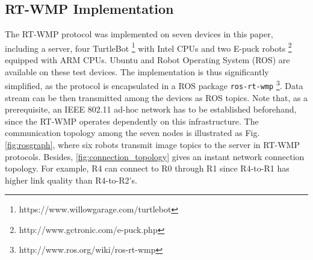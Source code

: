 \documentclass[journal]{IEEEtran}  %
\begin{document}
\subsection{RT-WMP Implementation}
\label{sec:rtwmp}
%
%
%

The RT-WMP protocol was implemented on seven devices in this paper, including a
server, four TurtleBot \footnote{https://www.willowgarage.com/turtlebot} with
Intel CPUs and two E-puck robots \footnote{http://www.gctronic.com/e-puck.php}
equipped with ARM CPUs.
Ubuntu and Robot Operating System (ROS) are available on these test devices.
The implementation is thus significantly simplified, as the protocol
is encapsulated in a ROS package \texttt{ros-rt-wmp}
\footnote{http://www.ros.org/wiki/ros-rt-wmp}. 
Data stream can be then transmitted among the devices as ROS topics.
Note that, as a prerequisite, an IEEE 802.11 ad-hoc network has to be
established beforehand, since the RT-WMP operates dependently on this
infrastructure.
The communication topology among the seven nodes is illustrated as Fig.
\ref{fig:rosgraph}, where
six robots transmit image topics to the server in RT-WMP protocols.
Besides, \ref{fig:connection_topology} gives an instant  network connection
topology. For example,  R4 can connect to R0 through R1 since R4-to-R1 has
higher link quality than R4-to-R2's. 
\end{document}
